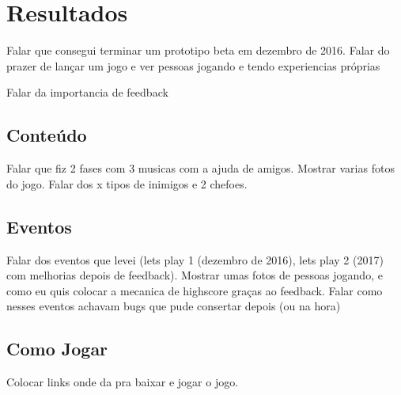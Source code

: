 \chapter{Resultados}
\label{cap:resultados}

Falar que consegui terminar um prototipo beta em  dezembro de 2016. Falar do prazer de lançar um jogo e ver pessoas jogando e tendo experiencias próprias

Falar da importancia de feedback

\section{Conteúdo}
\label{sec:conteudo}

Falar que fiz 2 fases com 3 musicas com a ajuda de amigos. Mostrar varias fotos do jogo. Falar dos x tipos de inimigos e 2 chefoes.

\section{Eventos}
\label{sec:eventos}

Falar dos eventos que levei (lets play 1 (dezembro de 2016), lets play 2 (2017) com melhorias depois de feedback). Mostrar umas fotos de pessoas jogando, e como eu quis colocar a mecanica de highscore graças ao feedback. Falar como nesses eventos achavam bugs que pude consertar depois (ou na hora)

\section{Como Jogar}
\label{sec:how_to_play}

Colocar links onde da pra baixar e jogar o jogo.
